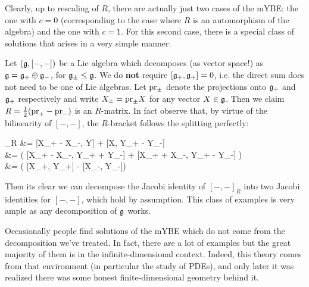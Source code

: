 \documentclass[main.tex]{subfiles}
\begin{document}
Clearly, up to rescaling of $R$, there are actually just two cases of the mYBE: the one with $c=0$ (corresponding to the case where $R$ is an automorphism of the algebra) and the one with $c=1$. For this second case, there is a special class of solutions that arises in a very simple manner:

\begin{construction}
	Let $(\mathfrak g, [-,-])$ be a Lie algebra which decomposes (as vector space!) as $\mathfrak g = \mathfrak g_+ \oplus \mathfrak g_-$, for $\mathfrak g_\pm \leq \mathfrak g$. We do \textbf{not} require $[\mathfrak g_+, \mathfrak g_+] = 0$, i.e. the direct sum does not need to be one of Lie algebras. Let $\mathrm{pr}_\pm$ denote the projections onto $\mathfrak g_+$ and $\mathfrak g_+$ respectively and write $X_\pm = \mathrm{pr}_\pm X$ for any vector $X \in \mathfrak g$. Then we claim $R = \frac12 (\mathrm{pr}_+ - \mathrm{pr}_-)$ is an $R$-matrix. In fact observe that, by virtue of the bilinearity of $[-,-]$, the $R$-bracket follows the splitting perfectly:
	\begin{eqalign}
		[X,Y]_R &=  [X_+ - X_-, Y] +  [X, Y_+ - Y_-]\\
			&=  \left( [X_+ - X_-, Y_+ + Y_-] + [X_+ + X_-, Y_+ - Y_-] \right)\\
			&=  \left( [X_+, Y_+] - [X_-, Y_-]\right)
	\end{eqalign}
	Then its clear we can decompose the Jacobi identity of $[-,-]_R$ into two Jacobi identities for $[-,-]$, which hold by assumption. This class of examples is very ample as any decomposition of $\mathfrak g$ works.
\end{construction}

Occasionally people find solutions of the mYBE which do not come from the decomposition we've treated. In fact, there are a lot of examples but the great majority of them is in the infinite-dimensional context. Indeed, this theory comes from that environment (in particular the study of PDEs), and only later it was realized there was some honest finite-dimensional geometry behind it.
\end{document}
